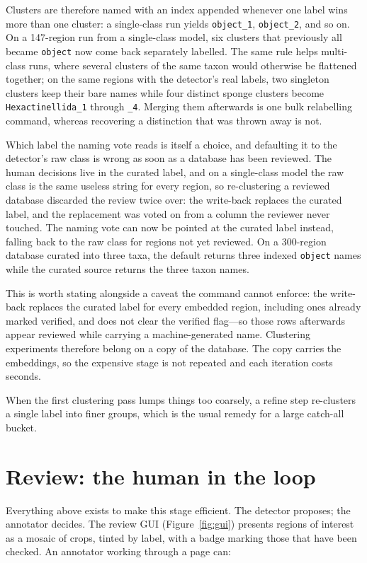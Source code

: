 \documentclass[10pt,letterpaper]{article}
\newcommand{\code}[1]{\texttt{\small #1}}
\begin{document}
Clusters are therefore named with an index appended whenever one label wins
more than one cluster: a single-class run yields \code{object\_1},
\code{object\_2}, and so on. On a 147-region run from a single-class model,
six clusters that previously all became \code{object} now come back separately
labelled. The same rule helps multi-class runs, where several clusters of the
same taxon would otherwise be flattened together; on the same regions with the
detector's real labels, two singleton clusters keep their bare names while four
distinct sponge clusters become \code{Hexactinellida\_1} through
\code{\_4}. Merging them afterwards is one bulk relabelling command, whereas
recovering a distinction that was thrown away is not.

Which label the naming vote reads is itself a choice, and defaulting it to the
detector's raw class is wrong as soon as a database has been reviewed. The
human decisions live in the curated label, and on a single-class model the raw
class is the same useless string for every region, so re-clustering a reviewed
database discarded the review twice over: the write-back replaces the curated
label, and the replacement was voted on from a column the reviewer never
touched. The naming vote can now be pointed at the curated label instead,
falling back to the raw class for regions not yet reviewed. On a 300-region
database curated into three taxa, the default returns three indexed
\code{object} names while the curated source returns the three taxon names.

This is worth stating alongside a caveat the command cannot enforce: the
write-back replaces the curated label for every embedded region, including ones
already marked verified, and does not clear the verified flag---so those rows
afterwards appear reviewed while carrying a machine-generated name. Clustering
experiments therefore belong on a copy of the database. The copy carries the
embeddings, so the expensive stage is not repeated and each iteration costs
seconds.

When the first clustering pass lumps things too coarsely, a refine step
re-clusters a single label into finer groups, which is the usual remedy for a
large catch-all bucket.

\section{Review: the human in the loop}

Everything above exists to make this stage efficient. The detector proposes; the
annotator decides. The review GUI (Figure~\ref{fig:gui}) presents regions of
interest as a mosaic of crops, tinted by label, with a badge marking those that
have been checked. An annotator working through a page can:
\end{document}
